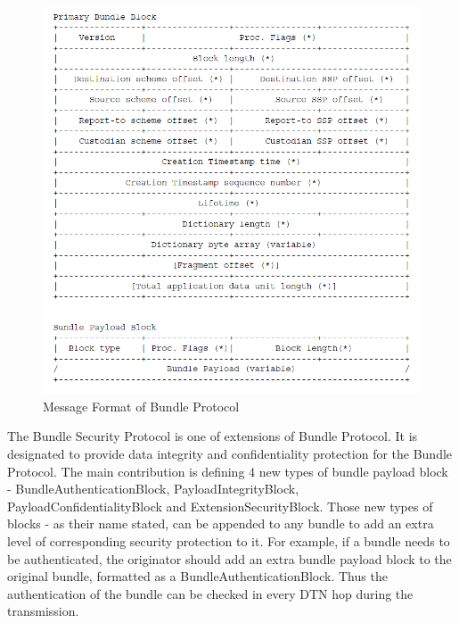 \begin{figure}[h!]
\centering
\includegraphics[width=\textwidth,natwidth=829,natheight=847]{figures/bundleblockformat.png}
\caption{Message Format of Bundle Protocol \cite{Scottrfc}}
\label{fig:bundleblockformat}
\end{figure}

The Bundle Security Protocol is one of extensions of Bundle Protocol. It is designated to provide data integrity and confidentiality protection for the Bundle Protocol. The main contribution is defining 4 new types of bundle payload block - BundleAuthenticationBlock, PayloadIntegrityBlock, PayloadConfidentialityBlock and ExtensionSecurityBlock. Those new types of blocks - as their name stated, can be appended to any bundle to add an extra level of corresponding security protection to it. For example, if a bundle needs to be authenticated, the originator should add an extra bundle payload block to the original bundle, formatted as a BundleAuthenticationBlock. Thus the authentication of the bundle can be checked in every DTN hop during the transmission.

